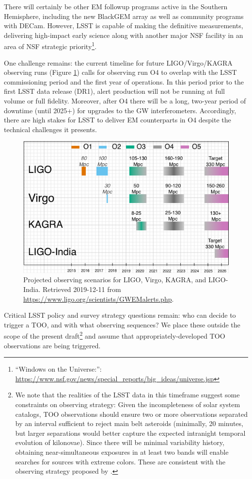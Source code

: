 \documentclass[DM,authoryear,toc]{lsstdoc}
\begin{document}
There will certainly be other EM followup programs active in the Southern Hemisphere, including the new BlackGEM array as well as community programs with DECam.
However, LSST is capable of making the definitive measurements, delivering high-impact early science along with another major NSF facility in an area of NSF strategic priority\footnote{``Windows on the Universe:'': \url{https://www.nsf.gov/news/special_reports/big_ideas/universe.jsp}}.

One challenge remains: the current timeline for future LIGO/Virgo/KAGRA observing runs (Figure \ref{fig:scenarios}) calls for observing run O4 to overlap with the LSST commissioning period and the first year of operations.
In this period prior to the first LSST data release (DR1), alert production will not be running at full volume or full fidelity.
Moreover, after O4 there will be a long, two-year period of downtime (until 2025+) for upgrades to the GW interferometers.  
Accordingly, there are high stakes for LSST to deliver EM counterparts in O4 despite the technical challenges it presents.

\begin{figure}
\includegraphics[width=\textwidth]{figures/LVK_run_plan_190711.png}
\caption{Projected observing scenarios for LIGO, Virgo, KAGRA, and LIGO-India.  Retrieved 2019-12-11 from 
\url{https://www.ligo.org/scientists/GWEMalerts.php}.
	\label{fig:scenarios}}
\end{figure}

Critical LSST policy and survey strategy questions remain: who can decide to trigger a TOO, and with what observing sequences?  
We place these outside the scope of the present draft\footnote{We note that the realities of the LSST data in this timeframe suggest some constraints on observing strategy:  
Given the incompleteness of solar system catalogs, TOO observations should ensure two or more observations separated by an interval sufficient to reject main belt asteroids (minimally, 20 minutes, but larger separations would better capture the expected intranight temporal evolution of kilonovae).  
Since there will be minimal variability history, obtaining near-simultaneous exposures in at least two bands will enable searches for sources with extreme colors.  
These are consistent with the observing strategy proposed by \citet{2018arXiv181204051M}.} and assume that appropriately-developed TOO observations are being triggered.
\end{document}
